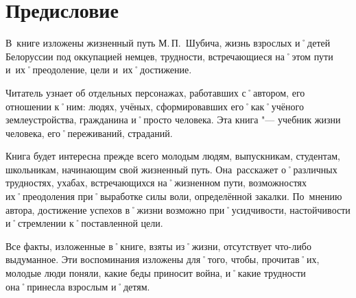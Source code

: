 ﻿\chapter{Предисловие}
В~книге изложены жизненный путь М.\,П.~Шубича, жизнь взрослых и˚детей Белоруссии под оккупацией немцев, трудности, встречающиеся на˚этом пути и~их˚преодоление, цели и~их˚достижение.

Читатель узнает об отдельных персонажах, работавших с˚автором, его отношении к˚ним: людях, учёных, сформировавших его˚как˚учёного землеустройства, гражданина и˚просто человека. Эта книга "--- учебник жизни человека, его˚переживаний, страданий.

Книга будет интересна прежде всего молодым людям, выпускникам, студентам, школьникам, начинающим свой жизненный путь. Она~расскажет о˚различных трудностях, ухабах, встречающихся на˚жизненном пути, возможностях их˚преодоления при˚выработке силы воли, определённой закалки. По~мнению автора, достижение успехов в˚жизни возможно при˚усидчивости, настойчивости и˚стремлении к˚поставленной цели.

Все факты, изложенные в˚книге, взяты из˚жизни, отсутствует что-либо выдуманное. Эти воспоминания изложены для˚того, чтобы, прочитав˚их, молодые люди поняли, какие беды приносит война, и˚какие трудности она˚принесла взрослым и˚детям.